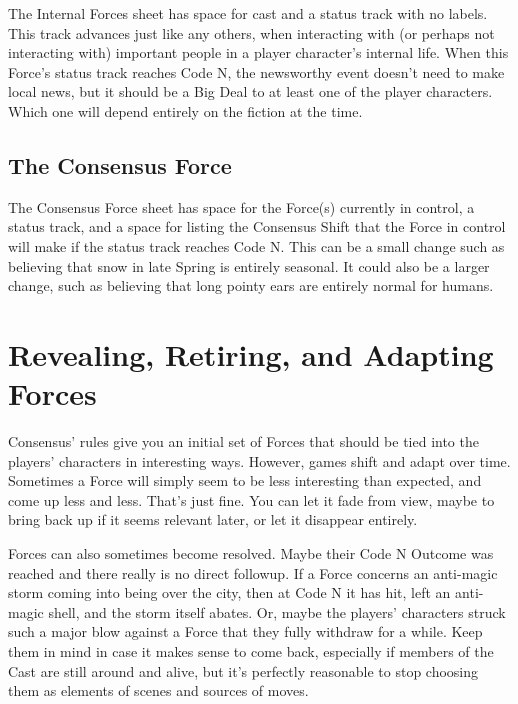 \documentclass[
  oneside,
  statementpaper,
  9pt]{memoir}
\begin{document}
The Internal Forces sheet has space for cast and a status track with no
labels. This track advances just like any others, when interacting with
(or perhaps not interacting with) important people in a player
character's internal life. When this Force's status track reaches Code
N, the newsworthy event doesn't need to make local news, but it should
be a Big Deal to at least one of the player characters. Which one will
depend entirely on the fiction at the time.

\hypertarget{the-consensus-force}{%
\subsection{The Consensus Force}\label{the-consensus-force}}

The Consensus Force sheet has space for the Force(s) currently in
control, a status track, and a space for listing the Consensus Shift
that the Force in control will make if the status track reaches Code N.
This can be a small change such as believing that snow in late Spring is
entirely seasonal. It could also be a larger change, such as believing
that long pointy ears are entirely normal for humans.

\hypertarget{revealing-retiring-and-adapting-forces}{%
\section{Revealing, Retiring, and Adapting
Forces}\label{revealing-retiring-and-adapting-forces}}

Consensus' rules give you an initial set of Forces that should be tied
into the players' characters in interesting ways. However, games shift
and adapt over time. Sometimes a Force will simply seem to be less
interesting than expected, and come up less and less. That's just fine.
You can let it fade from view, maybe to bring back up if it seems
relevant later, or let it disappear entirely.

Forces can also sometimes become resolved. Maybe their Code N Outcome
was reached and there really is no direct followup. If a Force concerns
an anti-magic storm coming into being over the city, then at Code N it
has hit, left an anti-magic shell, and the storm itself abates. Or,
maybe the players' characters struck such a major blow against a Force
that they fully withdraw for a while. Keep them in mind in case it makes
sense to come back, especially if members of the Cast are still around
and alive, but it's perfectly reasonable to stop choosing them as
elements of scenes and sources of moves.
\end{document}
